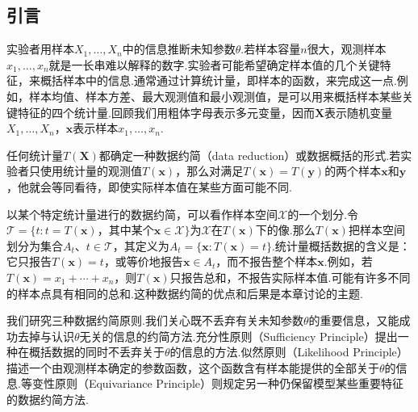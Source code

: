 \subsection{引言}\label{sec:6.1}
实验者用样本$X_1,\ldots,X_n$中的信息推断未知参数$\theta$.若样本容量$n$很大，观测样本$x_1,\ldots,x_n$就是一长串难以解释的数字.实验者可能希望确定样本值的几个关键特征，来概括样本中的信息.通常通过计算统计量，即样本的函数，来完成这一点.例如，样本均值、样本方差、最大观测值和最小观测值，是可以用来概括样本某些关键特征的四个统计量.回顾我们用粗体字母表示多元变量，因而$\boldsymbol X$表示随机变量$X_1,\ldots,X_n$，$\boldsymbol x$表示样本$x_1,\ldots,x_n$.

任何统计量$T(\boldsymbol X)$都确定一种数据约简（data reduction）或数据概括的形式.若实验者只使用统计量的观测值$T(\boldsymbol x)$，那么对满足$T(\boldsymbol x)=T(\boldsymbol y)$的两个样本$\boldsymbol x$和$\boldsymbol y$，他就会等同看待，即使实际样本值在某些方面可能不同.

以某个特定统计量进行的数据约简，可以看作样本空间$\mathcal X$的一个划分.令$\mathcal T=\{t:t=T(\boldsymbol x)\text{，其中某个}\boldsymbol x\in\mathcal X\}$为$\mathcal X$在$T(\boldsymbol x)$下的像.那么$T(\boldsymbol x)$把样本空间划分为集合$A_t$、$t\in\mathcal T$，其定义为$A_t=\{\boldsymbol x:T(\boldsymbol x)=t\}$.统计量概括数据的含义是：它只报告$T(\boldsymbol x)=t$，或等价地报告$\boldsymbol x\in A_t$，而不报告整个样本$\boldsymbol x$.例如，若$T(\boldsymbol x)=x_1+\cdots+x_n$，则$T(\boldsymbol x)$只报告总和，不报告实际样本值.可能有许多不同的样本点具有相同的总和.这种数据约简的优点和后果是本章讨论的主题.

我们研究三种数据约简原则.我们关心既不丢弃有关未知参数$\theta$的重要信息，又能成功去掉与认识$\theta$无关的信息的约简方法.充分性原则（Sufficiency Principle）提出一种在概括数据的同时不丢弃关于$\theta$的信息的方法.似然原则（Likelihood Principle）描述一个由观测样本确定的参数函数，这个函数含有样本能提供的全部关于$\theta$的信息.等变性原则（Equivariance Principle）则规定另一种仍保留模型某些重要特征的数据约简方法.
